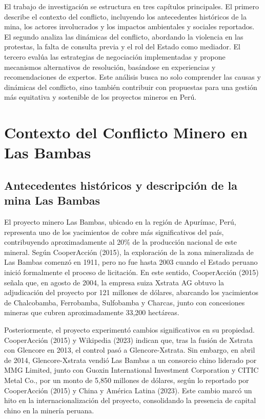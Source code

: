 \documentclass[
  stu,
  floatsintext,
  longtable,
  a4paper,
  nolmodern,
  notxfonts,
  notimes,
  colorlinks=true,linkcolor=blue,citecolor=blue,urlcolor=blue]{apa7}
\begin{document}
El trabajo de investigación se estructura en tres capítulos principales.
El primero describe el contexto del conflicto, incluyendo los
antecedentes históricos de la mina, los actores involucrados y los
impactos ambientales y sociales reportados. El segundo analiza las
dinámicas del conflicto, abordando la violencia en las protestas, la
falta de consulta previa y el rol del Estado como mediador. El tercero
evalúa las estrategias de negociación implementadas y propone mecanismos
alternativos de resolución, basándose en experiencias y recomendaciones
de expertos. Este análisis busca no solo comprender las causas y
dinámicas del conflicto, sino también contribuir con propuestas para una
gestión más equitativa y sostenible de los proyectos mineros en Perú.

\section{Contexto del Conflicto Minero en Las
Bambas}\label{contexto-del-conflicto-minero-en-las-bambas}

\subsection{Antecedentes históricos y descripción de la mina Las
Bambas}\label{antecedentes-histuxf3ricos-y-descripciuxf3n-de-la-mina-las-bambas}

El proyecto minero Las Bambas, ubicado en la región de Apurímac, Perú,
representa uno de los yacimientos de cobre más significativos del país,
contribuyendo aproximadamente al 20\% de la producción nacional de este
mineral. Según CooperAcción (2015), la exploración de la zona
mineralizada de Las Bambas comenzó en 1911, pero no fue hasta 2003
cuando el Estado peruano inició formalmente el proceso de licitación. En
este sentido, CooperAcción (2015) señala que, en agosto de 2004, la
empresa suiza Xstrata AG obtuvo la adjudicación del proyecto por 121
millones de dólares, abarcando los yacimientos de Chalcobamba,
Ferrobamba, Sulfobamba y Charcas, junto con concesiones mineras que
cubren aproximadamente 33,200 hectáreas.

Posteriormente, el proyecto experimentó cambios significativos en su
propiedad. CooperAcción (2015) y Wikipedia (2023) indican que, tras la
fusión de Xstrata con Glencore en 2013, el control pasó a
Glencore-Xstrata. Sin embargo, en abril de 2014, Glencore-Xstrata vendió
Las Bambas a un consorcio chino liderado por MMG Limited, junto con
Guoxin International Investment Corporation y CITIC Metal Co., por un
monto de 5,850 millones de dólares, según lo reportado por CooperAcción
(2015) y China y América Latina (2023). Este cambio marcó un hito en la
internacionalización del proyecto, consolidando la presencia de capital
chino en la minería peruana.
\end{document}
